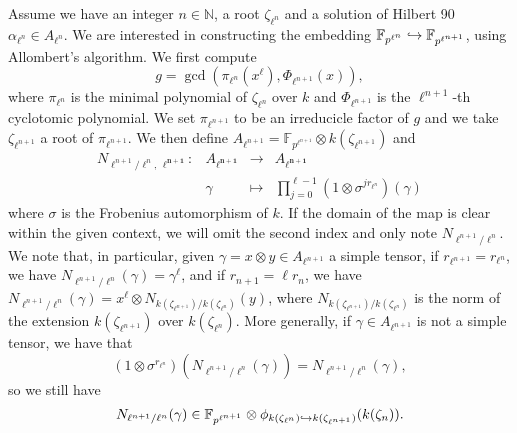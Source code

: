 \documentclass[a4paper,11pt]{article}
\begin{document}
Assume we have an integer $n\in\mathbb{N}$, a root
$\zeta_{\ell^n}$ and a solution of Hilbert 90 $\alpha_{\ell^n}\in A_{\ell^n}$. We are interested in
constructing the embedding $\mathbb{F}_{p^{\ell^n}}\hookrightarrow
\mathbb{F}_{p^{\ell^{n+1}}}$, using Allombert's algorithm. We
first compute 
\[
  g = \gcd(\pi_{\ell^n}(x^\ell), \Phi_{\ell^{n+1}}(x)),
\]
where $\pi_{\ell^n}$ is the minimal polynomial of $\zeta_{\ell^n}$ over $k$ and
$\Phi_{\ell^{n+1}}$ is the $\ell^{n+1}$-th cyclotomic polynomial. We set
$\pi_{\ell^{n+1}}$ to be an irreducicle factor of $g$ and we take
$\zeta_{\ell^{n+1}}$ a root
of $\pi_{\ell^{n+1}}$. We then define
$A_{\ell^{n+1}}=\mathbb{F}_{p^{\ell^{n+1}}}\otimes k(\zeta_{\ell^{n+1}})$ and
\[
\begin{array}{cccc}
  N_{\ell^{n+1}/\ell^n,\, \bm{\ell^{n+1}}}: & A_{\bm{\ell^{n+1}}} & \to &
  A_{\bm{\ell^{n+1}}} \\
  & \gamma & \mapsto & \prod_{j=0}^{\ell-1} (1 \otimes
  \sigma^{jr_{\ell^n}})(\gamma)
\end{array}
\]
where $\sigma$ is the Frobenius automorphism of $k$. If the domain of the map is
clear within the given context, we will omit the second index and only note
$N_{\ell^{n+1}/\ell^n}$. We note that, in particular, given
$\gamma=x\otimes y\in A_{\ell^{n+1}}$ a simple tensor, if
$r_{\ell^{n+1}}=r_{\ell^n}$, we have $N_{\ell^{n+1}/\ell^n}(\gamma) =
\gamma^\ell$, and if $r_{n+1}=\ell r_n$, we have $N_{\ell^{n+1}/\ell^n}(\gamma) = x^\ell\otimes
N_{k(\zeta_{\ell^{n+1}})/k(\zeta_{\ell^n})}(y)$, where
$N_{k(\zeta_{\ell^{n+1}})/k(\zeta_{\ell^n})}$ is the
norm of the extension $k(\zeta_{\ell^{n+1}})$ over $k(\zeta_{\ell^n})$. More generally, if $\gamma\in
A_{\ell^{n+1}}$ is not a simple tensor, we have that
\[
  (1\otimes\sigma^{r_{\ell^n}})(N_{\ell^{n+1}/\ell^n}(\gamma)) =
  N_{\ell^{n+1}/\ell^n}(\gamma),
\]
so we still have 
\[
  N_{\ell^{n+1}/\ell^n}(\gamma)\in \mathbb{F}_{p^{\ell^{n+1}}}\otimes \phi_{k(\zeta_{\ell^n})\hookrightarrow
k(\zeta_{\ell^{n+1}})}(k(\zeta_n)).
\]
\end{document}
